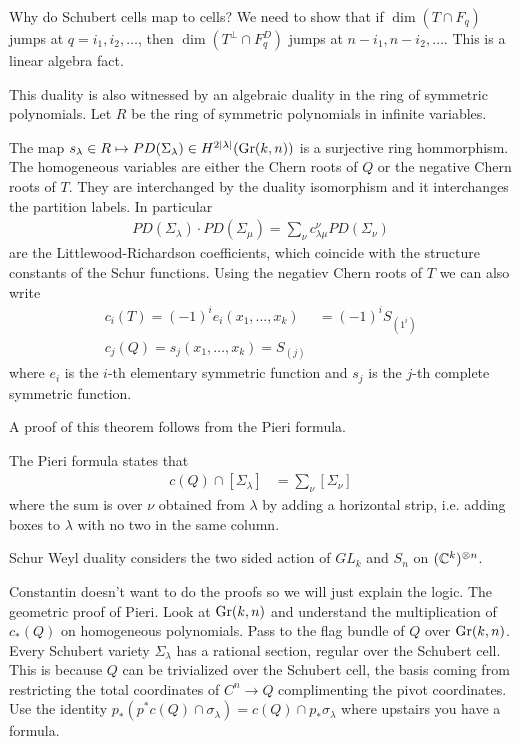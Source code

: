 \documentclass[12pt]{article}
\begin{document}
Why do Schubert cells map to cells? We need to show that if $\dim(T\cap F_q)$ jumps at $q = i_1, i_2, \dots$, then $\dim(T^\perp \cap F_{q}^D)$ jumps at $n - i_1, n - i_2, \dots$. This is a linear algebra fact.

This duality is also witnessed by an algebraic duality in the ring of symmetric polynomials. Let $R$ be the ring of symmetric polynomials in infinite variables. 

\begin{theorem}
    The map $s_\lambda \in R \mapsto PD(\Sigma_\lambda)\in H^{2|\lambda|}(\operatorname{Gr}(k,n))$ is a surjective ring hommorphism. The homogeneous variables are either the Chern roots of $Q$ or the negative Chern roots of $T$. They are interchanged by the duality isomorphism and it interchanges the partition labels. In particular \begin{align*}
        PD(\Sigma_\lambda) \cdot PD(\Sigma_\mu) = \sum_\nu c_{\lambda\mu}^\nu PD(\Sigma_\nu)
    \end{align*} are the Littlewood-Richardson coefficients, which coincide with the structure constants of the Schur functions. Using the negatiev Chern roots of $T$ we can also write \begin{align*}
        c_i(T) = (-1)^i e_i(x_1,\dots, x_k) &= (-1)^i S_{(1^i)} \\
        c_j(Q) = s_j(x_1,\dots, x_k) = S_{(j)}
    \end{align*} where $e_i$ is the $i$-th elementary symmetric function and $s_j$ is the $j$-th complete symmetric function.
\end{theorem}

A proof of this theorem follows from the Pieri formula.

\begin{theorem}
    The Pieri formula states that \begin{align*}
        c(Q) \cap [\Sigma_\lambda] &= \sum_{\nu} [\Sigma_\nu] 
    \end{align*} where the sum is over $\nu$ obtained from $\lambda$ by adding a horizontal strip, i.e. adding boxes to $\lambda$ with no two in the same column.
\end{theorem}

\begin{remark}
    Schur Weyl duality considers the two sided action of $GL_k$ and $S_n$ on $(\mathbb{C}^k)^{\otimes n}$.
\end{remark}

Constantin doesn't want to do the proofs so we will just explain the logic. The geometric proof of Pieri. Look at $\operatorname{Gr}(k,n)$ and understand the multiplication of $c_*(Q)$ on homogeneous polynomials. Pass to the flag bundle of $Q$ over $\operatorname{Gr}(k,n)$. Every Schubert variety $\Sigma_\lambda$ has a rational section, regular over the Schubert cell. This is because $Q$ can be trivialized over the Schubert cell, the basis coming from restricting the total coordinates of $C^n\to Q$ complimenting the pivot coordinates. Use the identity $p_*(p^* c(Q) \cap \sigma_\lambda) = c(Q) \cap p_* \sigma_\lambda$ where upstairs you have a formula. 
\end{document}
